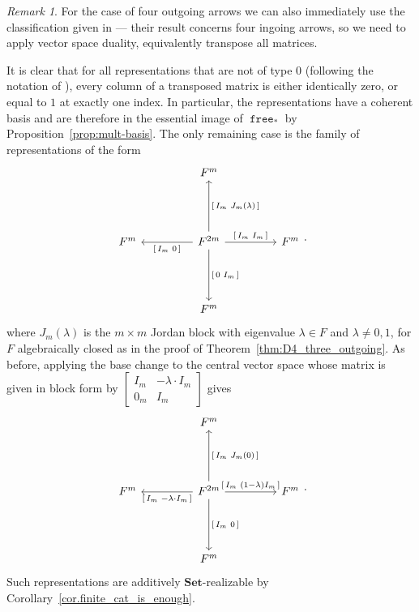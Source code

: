 \documentclass[a4paper]{amsart}
\theoremstyle{plain}
\theoremstyle{definition}
\theoremstyle{remark}
\newtheorem{remark}[theorem]{Remark}
\newcommand{\funct}[1]{\operatorname{\mathtt{#1}}}
\newcommand{\Set}{\mathbf{Set}}
\begin{document}
\begin{remark}
For the case of four outgoing arrows we can also immediately use the classification given in \cite{medina2004four} --- their result concerns four ingoing arrows, so we need to apply vector space duality, equivalently transpose all matrices.

It is clear that for all representations that are not of type $0$ (following the notation of \cite{medina2004four}), every column of a transposed matrix is either identically zero, or equal to $1$ at exactly one index. In particular, the representations have a coherent basis and are therefore in the essential image of $\funct{free}_*$ by Proposition~\ref{prop:mult-basis}. The only remaining case is the family of representations of the form
\[\begin{tikzcd}[sep=16mm, ampersand replacement = \&]
\& F^m\&  \\
F^m  \& \ar[l, "{\left[ \begin{smallmatrix} I_m & 0 \end{smallmatrix} \right]}"]F^{2m}\ar[u,swap, "{\left[ \begin{smallmatrix} I_m & J_m(\lambda) \end{smallmatrix} \right]}"] \ar[r, "{\left[ \begin{smallmatrix} I_m & I_m \end{smallmatrix} \right]}"]\ar[d, "{\left[ \begin{smallmatrix} 0 & I_m \end{smallmatrix} \right]}"] \& F^m \\
\& F^m   \& \end{tikzcd}.\]
where $J_m(\lambda)$ is the $m\times m$ Jordan block with eigenvalue $\lambda\in F$ and $\lambda\neq 0,1$, for $F$ algebraically closed as in the proof of Theorem~\ref{thm:D4_three_outgoing}. As before, applying the base change to the central vector space whose matrix is given in block form by $\left[ \begin{smallmatrix} I_m & -\lambda\cdot I_m \\ 0_m & I_m \end{smallmatrix} \right]$
gives
\[\begin{tikzcd}[sep=16mm, ampersand replacement = \&]
\& F^m\&  \\
F^m \& \ar[l, "{\left[ \begin{smallmatrix} I_m & -\lambda\cdot I_m \end{smallmatrix} \right]}"] F^{2m}\ar[u,swap, "{\left[ \begin{smallmatrix} I_m & J_m(0) \end{smallmatrix} \right]}"] \ar[r, "{\left[ \begin{smallmatrix} I_m & (1-\lambda)I_m \end{smallmatrix} \right]}"] \ar[d, "{\left[ \begin{smallmatrix} I_m & 0 \end{smallmatrix} \right]}"] \& F^m \\
\& F^m  \& \end{tikzcd}.\]
Such representations are additively $\Set$-realizable by Corollary~\ref{cor.finite_cat_is_enough}.
\end{remark}
\end{document}
